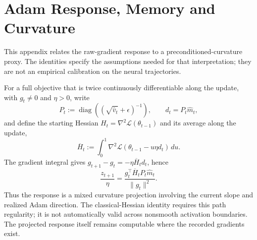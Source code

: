 \section{Adam Response, Memory and Curvature}
\label{appendix:adam-memory}

This appendix relates the raw-gradient response to a preconditioned-curvature
proxy. The identities specify the assumptions needed for that interpretation;
they are not an empirical calibration on the neural trajectories.

For a full objective that is twice continuously differentiable along
the update, with $g_t\ne0$ and $\eta>0$, write
\begin{equation}
P_t:=\operatorname{diag}
\left((\sqrt{\widehat v_t}+\epsilon)^{-1}\right),
\qquad d_t=P_t\widehat m_t,
\end{equation}
and define the starting Hessian $H_t=\nabla^2\mathcal L(\theta_{t-1})$
and its average along the update,
\begin{equation}
\overline H_t:=
\int_0^1\nabla^2\mathcal L(\theta_{t-1}-u\eta d_t)\,du.
\end{equation}
The gradient integral gives
$g_{t+1}-g_t=-\eta\overline H_td_t$, hence
\begin{equation}
\frac{z_{t+1}}{\eta}
=
\frac{g_t^\top\overline H_tP_t\widehat m_t}{\|g_t\|^2}.
\label{eq:adam-response-integral}
\end{equation}
Thus the response is a mixed curvature projection involving the current
slope and realized Adam direction. The classical-Hessian identity requires
this path regularity; it is not automatically valid across nonsmooth
activation boundaries. The projected response itself remains computable
where the recorded gradients exist.

